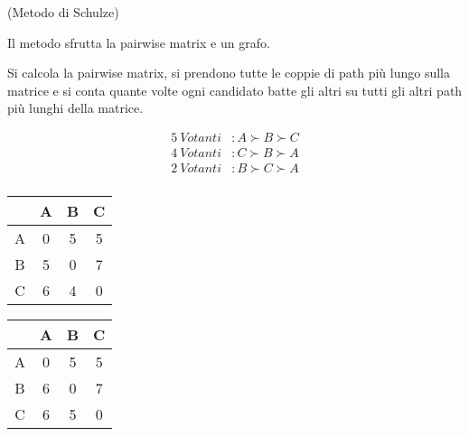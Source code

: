 \begin{esempio}
    (Metodo di Schulze)

    Il metodo sfrutta la pairwise matrix e un grafo. 

    Si calcola la pairwise matrix, si prendono tutte le coppie di path più lungo sulla matrice e si conta quante volte ogni candidato batte
    gli altri su tutti gli altri path più lunghi della matrice.

    \begin{equation}
        \begin{aligned}
            5 \ Votanti &: A \succ B \succ C \\
            4 \ Votanti &: C \succ B \succ A \\
            2 \ Votanti &: B \succ C \succ A \\
        \end{aligned}
    \end{equation}

    \begin{table}[H]
        \centering
        \begin{tabular}{|c|c|c|c|}
            \hline
            & A & B & C \\
            \hline
            A & 0 & 5 & 5 \\
            \hline
            B &5 & 0 & 7 \\
            \hline
            C & 6 & 4 & 0 \\
            \hline
        \end{tabular}
    \end{table}

    \begin{figure}[H]
        \centering
    \end{figure}

    \begin{table}[H]
        \centering
        \begin{tabular}{|c|c|c|c|}
            \hline
            & A & B & C \\
            \hline
            A & 0 & 5 & 5 \\
            \hline
            B &6 & 0 & 7 \\
            \hline
            C & 6 & 5 & 0 \\
            \hline
        \end{tabular}
    \end{table}
\end{esempio}
